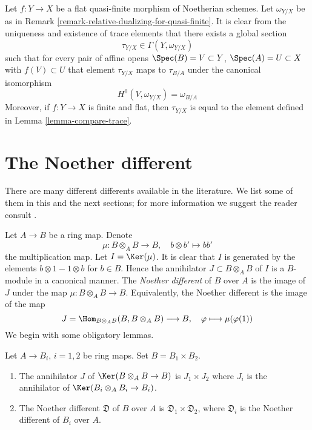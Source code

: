 \begin{remark}
\label{remark-relative-dualizing-for-flat-quasi-finite}
Let $f : Y \to X$ be a flat quasi-finite morphism of Noetherian schemes.
Let $\omega_{Y/X}$ be as in
Remark \ref{remark-relative-dualizing-for-quasi-finite}.
It is clear from the uniqueness and existence of trace elements
that there exists a global section
$$
\tau_{Y/X} \in \Gamma(Y, \omega_{Y/X})
$$
such that for every pair of affine opens
$\Spec(B) = V \subset Y$, $\Spec(A) = U \subset X$ with $f(V) \subset U$
that element $\tau_{Y/X}$ maps to $\tau_{B/A}$ under the
canonical isomorphism
$$
H^0(V, \omega_{Y/X}) = \omega_{B/A}
$$
Moreover, if $f : Y \to X$ is finite and flat, then
$\tau_{Y/X}$ is equal to the element defined in Lemma \ref{lemma-compare-trace}.
\end{remark}





\section{The Noether different}
\label{section-noether-different}

\noindent
There are many different differents available in the literature.
We list some of them in this and the next sections; for more
information we suggest the reader consult \cite{Kunz}.

\medskip\noindent
Let $A \to B$ be a ring map. Denote
$$
\mu : B \otimes_A B \longrightarrow B,\quad
b \otimes b' \longmapsto bb'
$$
the multiplication map. Let $I = \Ker(\mu)$. It is clear that $I$ is
generated by the elements $b \otimes 1 - 1 \otimes b$ for $b \in B$.
Hence the annihilator $J \subset B \otimes_A B$ of $I$ is a $B$-module
in a canonical manner. The {\it Noether different} of $B$ over $A$ is
the image of $J$ under the map $\mu : B \otimes_A B \to B$. Equivalently,
the Noether different is the image of the map
$$
J = \Hom_{B \otimes_A B}(B, B \otimes_A B) \longrightarrow B,\quad
\varphi \longmapsto \mu(\varphi(1))
$$
We begin with some obligatory lemmas.

\begin{lemma}
\label{lemma-noether-different-product}
Let $A \to B_i$, $i = 1, 2$ be ring maps. Set $B = B_1 \times B_2$.
\begin{enumerate}
\item The annihilator $J$ of $\Ker(B \otimes_A B \to B)$ is $J_1 \times J_2$
where $J_i$ is the annihilator of $\Ker(B_i \otimes_A B_i \to B_i)$.
\item The Noether different $\mathfrak{D}$ of $B$ over $A$ is
$\mathfrak{D}_1 \times \mathfrak{D}_2$, where $\mathfrak{D}_i$ is
the Noether different of $B_i$ over $A$.
\end{enumerate}
\end{lemma}

